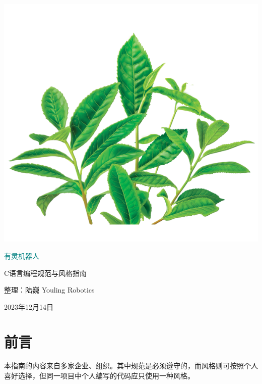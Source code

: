 \documentclass[oneside,fontset=founder]{ctexbook}
\begin{document}
\begin{titlepage}%
\begin{center}
  \quad

  \vspace{2ex}

  \includegraphics[width=.4\textwidth]{images/cover.png}

  \vspace{4ex}

  \Huge\heiti\textcolor{teal}{有灵机器人}

  \vspace{2ex}

  C语言编程规范与风格指南\normalsize\normalfont

  \vspace{4ex}

  整理：陆巍
  \vfill%
  Youling Robotics

  2023年12月14日
\end{center}
\end{titlepage}


\frontmatter%


\chapter{前言}
本指南的内容来自多家企业、组织。其中规范是必须遵守的，而风格则可按照个人喜好选择，但同一项目中个人编写的代码应只使用一种风格。


\tableofcontents%


\mainmatter


\end{document}
